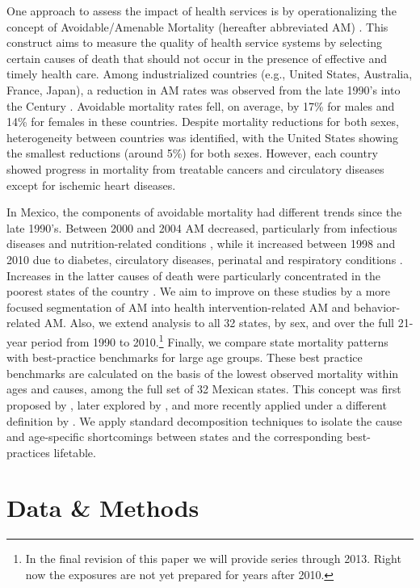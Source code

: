 \documentclass{article}
\begin{document}
 One approach to assess the impact of health services is by operationalizing the
 concept of Avoidable/Amenable Mortality (hereafter abbreviated AM)
 \citep{nolte&mckee2004, nolte&mckee2008}. This construct aims to measure the quality of health service systems by selecting certain
 causes of death that should not occur in the presence of effective and
 timely health care. Among industrialized countries (e.g., United States,
 Australia, France, Japan), a reduction in AM rates was
 observed from the late 1990's into the  Century
 \citep{nolte&mckee2008}. Avoidable mortality rates fell, on average, by 17\%
 for males and 14\% for females in these countries. Despite mortality reductions for
 both sexes, heterogeneity between countries was identified, with the United
 States showing the smallest reductions (around 5\%) for both sexes. However,
 each country showed progress in mortality from treatable cancers and
 circulatory diseases except for ischemic heart diseases.

In Mexico, the components of avoidable mortality had different trends since the
late 1990's. Between 2000 and 2004 AM decreased, particularly from
infectious diseases and nutrition-related conditions \citep{francomarina2006}, while it increased between 1998 and 2010 due to diabetes, circulatory diseases, perinatal and respiratory conditions
\citep{agudelo2014efecto}. Increases in the latter causes
of death were particularly concentrated in the poorest states of the country
\citep{davila2014mortalidad}. We aim to improve on these studies
by a more focused segmentation of AM into health intervention-related AM and
behavior-related AM. Also, we extend analysis to all 32 states, by sex, and over
the full 21-year period from 1990 to 2010.\footnote{In the final revision of
this paper we will provide series through 2013. Right now the exposures are not
yet prepared for years after 2010.} Finally, we compare state mortality patterns
with best-practice benchmarks for large age groups. These best practice
benchmarks are calculated on the basis of the lowest observed mortality within
ages and causes, among the full set of 32 Mexican states. This concept was first
proposed by \citet{wunsch1975minimum}, later explored by
\citet{vallin2008minimum}, and more recently applied under a different
definition by \citet{eikemo2014}. We apply standard decomposition techniques to
isolate the cause and age-specific shortcomings between states and the
corresponding best-practices lifetable. 

\section*{Data \& Methods} 
 
\end{document}
